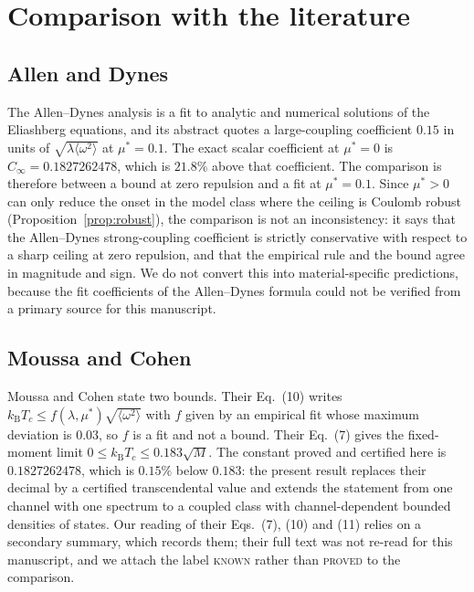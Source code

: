 \documentclass[aps,10pt,superscriptaddress,floatfix,amsmath,amssymb,nofootinbib]{revtex4-2}
\newcommand{\kb}{k_{\mathrm B}}
\newcommand{\Cinf}{C_\infty}
\newcommand{\muS}{\mu^{*}}
\newcommand{\PROVED}{\textsc{proved}}
\newcommand{\KNOWN}{\textsc{known}}
\begin{document}
\section{Comparison with the literature}\label{sec:lit}

\subsection{Allen and Dynes}

The Allen--Dynes analysis \cite{allendynes} is a fit to analytic and numerical solutions of
the Eliashberg equations, and its abstract quotes a large-coupling coefficient $0.15$ in
units of $\sqrt{\lambda\langle\omega^{2}\rangle}$ at $\muS=0.1$. The exact scalar
coefficient at $\muS=0$ is $\Cinf=0.1827262478$, which is $21.8\%$ above that coefficient.
The comparison is therefore between a bound at zero repulsion and a fit at
$\muS=0.1$. Since
$\muS>0$ can only reduce the onset in the model class where the ceiling is Coulomb robust
(Proposition~\ref{prop:robust}), the comparison is not an inconsistency: it says that the
Allen--Dynes strong-coupling coefficient is strictly conservative with respect to a sharp
ceiling at zero repulsion, and that the empirical rule and the bound agree in magnitude and
sign. We do not convert this into material-specific predictions, because the fit
coefficients of the Allen--Dynes formula could not be verified from a primary source for
this manuscript.

\subsection{Moussa and Cohen}

Moussa and Cohen \cite{moussa} state two bounds. Their Eq.~(10) writes
$\kb T_c\le f(\lambda,\muS)\sqrt{\langle\omega^{2}\rangle}$ with $f$ given by an empirical
fit whose maximum deviation is $0.03$, so $f$ is a fit and not a bound. Their Eq.~(7) gives
the fixed-moment limit $0\le\kb T_c\le0.183\sqrt M$. The constant proved and certified here
is $0.1827262478$, which is $0.15\%$ below $0.183$: the present result replaces their
decimal by a certified transcendental value and extends the statement from one channel
with one spectrum to a coupled class with channel-dependent bounded densities of states.
Our reading of their Eqs.~(7), (10) and (11) relies on a secondary summary, which records
them; their full text was not re-read for this manuscript, and we attach the label
\KNOWN{} rather than \PROVED{} to the comparison.
\end{document}
